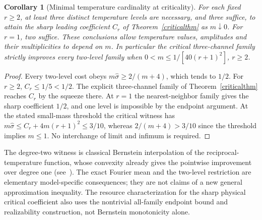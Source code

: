 \documentclass[11pt]{article}
\newtheorem{corollary}[theorem]{Corollary}
\begin{document}
\begin{corollary}[Minimal temperature cardinality at criticality]\label{criticalcount}
For each fixed $r\ge2$, at least three distinct temperature levels are necessary, and three suffice, to attain the sharp leading coefficient $C_r$ of Theorem~\ref{criticalthm} as $m\downarrow0$. For $r=1$, two suffice. These conclusions allow temperature values, amplitudes and their multiplicities to depend on $m$. In particular the critical three-channel family strictly improves every two-level family when $0<m\le 1/[40(r+1)^2]$, $r\ge2$.
\end{corollary}
\begin{proof}
Every two-level cost obeys $m\hat\sigma\ge2/(m+4)$, which tends to $1/2$. For $r\ge2$, $C_r\le1/5<1/2$. The explicit three-channel family of Theorem~\ref{criticalthm} reaches $C_r$ by the squeeze there. At $r=1$ the nearest-neighbor family gives the sharp coefficient $1/2$, and one level is impossible by the endpoint argument. At the stated small-mass threshold the critical witness has $m\hat\sigma\le C_r+4m(r+1)^2\le3/10$, whereas $2/(m+4)>3/10$ since the threshold implies $m\le1$. No interchange of limit and infimum is required.
\end{proof}
The degree-two witness is classical Bernstein interpolation of the reciprocal-temperature function, whose convexity already gives the pointwise improvement over degree one (see~\cite[Corollary~2.2]{bernsteinmonotone}). The exact Fourier mean and the two-level restriction are elementary model-specific consequences; they are not claims of a new general approximation inequality. The resource characterization for the sharp physical critical coefficient also uses the nontrivial all-family endpoint bound and realizability construction, not Bernstein monotonicity alone.
\end{document}
